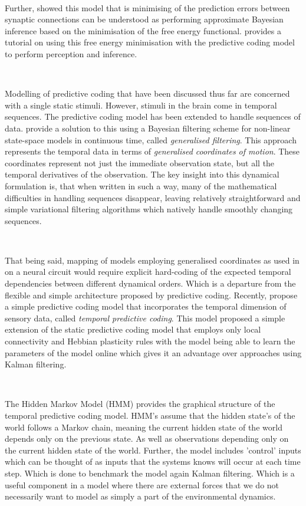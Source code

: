 \documentclass{article}
\begin{document}
\

Further, \citet{friston2005theory} showed this model that is minimising of the prediction errors between synaptic connections can be understood as performing approximate Bayesian inference based on the minimisation of the free energy functional. \citet{bogacz2017tutorial} provides a tutorial on using this free energy minimisation with the predictive coding model to perform perception and inference. 

\

Modelling of predictive coding that have been discussed thus far are concerned with a single static stimuli. However, stimuli in the brain come in temporal sequences. The predictive coding model has been extended to handle sequences of data. \citet{friston2010filtering} provide a solution to this using a Bayesian filtering scheme for non-linear state-space models in continuous time, called \textit{generalised filtering}. This approach represents the temporal data in terms of \textit{generalised coordinates of motion}. These  coordinates represent not just the immediate observation state, but all the temporal  derivatives of the observation. The key insight into this dynamical  formulation is, that when written in such a way, many of the mathematical difficulties in  handling sequences disappear, leaving relatively straightforward and simple variational filtering algorithms which natively handle smoothly changing sequences.

\

That being said, mapping of models employing generalised coordinates as used in \citet{friston2010filtering} on a neural circuit would require explicit hard-coding of the expected temporal dependencies between different dynamical orders. Which is a departure from the flexible and simple architecture proposed by predictive coding. Recently, \citet{millidge2024temporal} propose a simple predictive coding model that incorporates the temporal dimension of sensory data, called \textit{temporal predictive coding}. This model proposed a simple extension of the static predictive coding model that employs only local connectivity and Hebbian plasticity rules with the model being able to learn the parameters of the model online which gives it an advantage over approaches using Kalman filtering. 

\

The Hidden Markov Model (HMM) provides the graphical structure of the temporal predictive coding model. HMM's assume that the hidden state's of the world follows a Markov chain, meaning the current hidden state of the world depends only on the previous state. As well as observations depending only on the current hidden state of the world. Further, the model includes 'control' inputs which can be thought of as inputs that the systems knows will occur at each time step. Which is done to benchmark the model again Kalman filtering. Which is a useful component in a model where there are external forces that we do not necessarily want to model as simply a part of the environmental dynamics.
\end{document}

